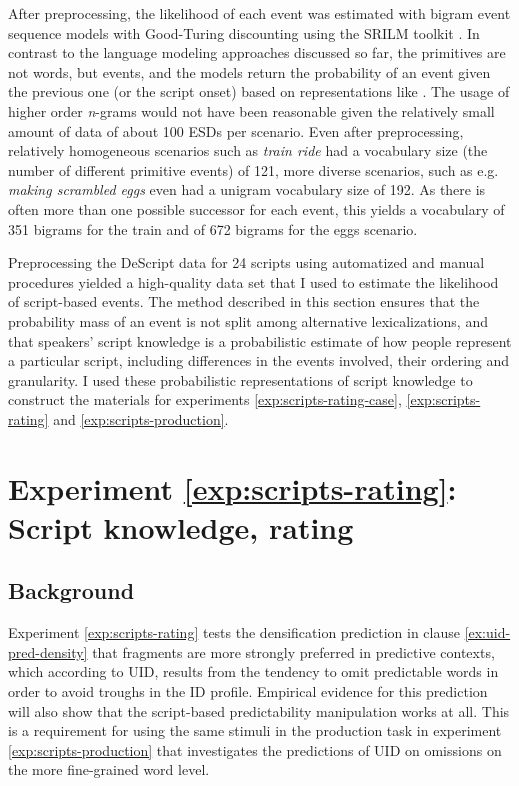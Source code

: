 After preprocessing, the likelihood of each event was estimated with bigram event sequence models with Good-Turing discounting using the SRILM toolkit \citep{stolcke2002}. In contrast to the language modeling approaches discussed so far, the primitives are not words, but events, and the models return the probability of an event given the previous one (or the script onset) based on representations like \Last. The usage of higher order \textit{n}-grams would not have been reasonable given the relatively small amount of data of about 100 ESDs per scenario. Even after preprocessing, relatively homogeneous scenarios such as \textit{train ride} had a vocabulary size (the number of different primitive events) of 121, more diverse scenarios, such as e.g. \textit{making scrambled eggs} even had a unigram vocabulary size of 192. As there is often more than one possible successor for each event, this yields a vocabulary of 351 bigrams for the train and of 672 bigrams for the eggs scenario.

Preprocessing the DeScript data for 24 scripts using automatized and manual procedures yielded a high-quality data set that I used to estimate the likelihood of script-based events. The method described in this section ensures that the probability mass of an event is not split among alternative lexicalizations, and that speakers' script knowledge is a probabilistic estimate of how people represent a particular script, including differences in the events involved, their ordering and granularity. I used these probabilistic representations of script knowledge to construct the materials for experiments \ref{exp:scripts-rating-case}, \ref{exp:scripts-rating} and \ref{exp:scripts-production}.

\label{exp:scripts-rating}
\section{Experiment \ref{exp:scripts-rating}: Script knowledge, rating}  \label{sec:scripts-rating}

\subsection{Background}
Experiment \ref{exp:scripts-rating} tests the densification prediction in clause \ref{ex:uid-pred-density} that fragments are more strongly preferred in predictive contexts, which according to UID, results from the tendency to omit predictable words in order to avoid troughs in the ID profile. Empirical evidence for this prediction will also show that the script-based predictability manipulation works at all. This is a requirement for using the same stimuli in the production task in experiment \ref{exp:scripts-production} that investigates the predictions of UID on omissions on the more fine-grained word level.

